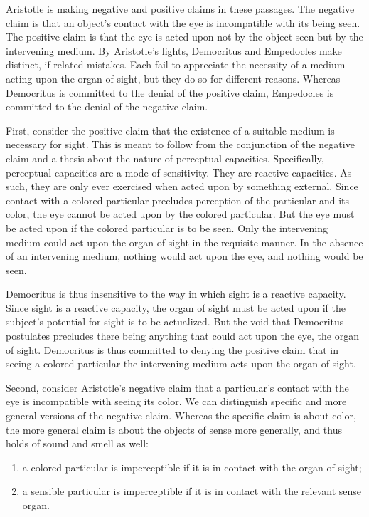 Aristotle is making negative and positive claims in these passages. The negative claim is that an object's contact with the eye is incompatible with its being seen. The positive claim is that the eye is acted upon not by the object seen but by the intervening medium. By Aristotle's lights, Democritus and Empedocles make distinct, if related mistakes. Each fail to appreciate the necessity of a medium acting upon the organ of sight, but they do so for different reasons. Whereas Democritus is committed to the denial of the positive claim, Empedocles is committed to the denial of the negative claim.

First, consider the positive claim that the existence of a suitable medium is necessary for sight. This is meant to follow from the conjunction of the negative claim and a thesis about the nature of perceptual capacities. Specifically, perceptual capacities are a mode of sensitivity. They are reactive capacities. As such, they are only ever exercised when acted upon by something external. Since contact with a colored particular precludes perception of the particular and its color, the eye cannot be acted upon by the colored particular. But the eye must be acted upon if the colored particular is to be seen. Only the intervening medium could act upon the organ of sight in the requisite manner. In the absence of an intervening medium, nothing would act upon the eye, and nothing would be seen.

Democritus is thus insensitive to the way in which sight is a reactive capacity. Since sight is a reactive capacity, the organ of sight must be acted upon if the subject's potential for sight is to be actualized. But the void that Democritus postulates precludes there being anything that could act upon the eye, the organ of sight. Democritus is thus committed to denying the positive claim that in seeing a colored particular the intervening medium acts upon the organ of sight.

Second, consider Aristotle's negative claim that a particular's contact with the eye is incompatible with seeing its color.  We can distinguish specific and more general versions of the negative claim. Whereas the specific claim is about color, the more general claim is about the objects of sense more generally, and thus holds of sound and smell as well:
\begin{enumerate}[(1)]
	\item a colored particular is imperceptible if it is in contact with the organ of sight;
	\item a sensible particular is imperceptible if it is in contact with the relevant sense organ.
\end{enumerate}

